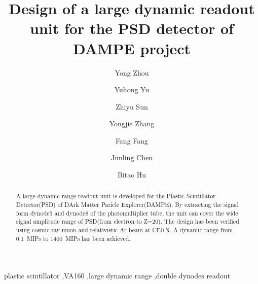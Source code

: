 \documentclass[5p, times]{elsarticle}
\begin{document}
\begin{frontmatter}

\title{Design of a large dynamic readout unit for the PSD detector of DAMPE project}

\author[imp,lzu,ucas]{Yong Zhou}

\author[imp]{Yuhong Yu}

\author[imp]{Zhiyu Sun}
\author[imp]{Yongjie Zhang}
\author[imp]{Fang Fang}
\author[imp]{Junling Chen}

\author[lzu]{Bitao Hu}

\address[imp]{Institute of Modern Physics, Chinese Academy of Sciences,  509 Nanchang Road,  Lanzhou,  730000,  P.R.China}
\address[lzu]{School of Nuclear Science and Technology,  Lanzhou University,  222 South Tianshui Road,  Lanzhou,  730000,  P.R.China}
\address[ucas]{Graduate University of the Chinese Academy of Sciences,  19A Yuquan Road,  Beijing,  100049,  P.R.China}

\begin{abstract}

A large dynamic range readout unit is developed for the Plastic Scintillator Detector(PSD) of DArk Matter Paricle Explorer(DAMPE).
By extracting the signal form dynode5 and dynode8 of the photomultiplier tube, the unit can cover the wide signal amplitude range of PSD(from electron to Z=20).
The design has been verified using cosmic ray muon and relativistic Ar beam at CERN.
A dynamic range from \SI{0.1}{MIPs} to \SI{1400}{MIPs} has been achieved.

\end{abstract}

\begin{keyword}
plastic scintillator
\sep VA160
\sep large dynamic range
\sep double dynodes readout


\end{keyword}

\end{frontmatter}
\end{document}

